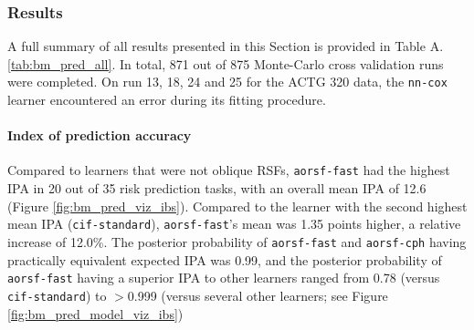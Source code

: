 \documentclass{article}\usepackage[]{graphicx}\usepackage[]{xcolor}
\newcommand{\tabrefAppendix}[1]{Table A.\ref{#1}}
\begin{document}
\subsubsection{Results} \label{sec:results_pred}

A full summary of all results presented in this Section is provided in \tabrefAppendix{tab:bm_pred_all}. In total, 871 out of 875 Monte-Carlo cross validation runs were completed. On run 13, 18, 24 and 25 for the ACTG 320 data, the \texttt{nn-cox} learner encountered an error during its fitting procedure.

\paragraph{Index of prediction accuracy}

Compared to learners that were not oblique RSFs, \texttt{aorsf-fast} had the highest IPA in 20 out of 35 risk prediction tasks, with an overall mean IPA of 12.6 (Figure \ref{fig:bm_pred_viz_ibs}). Compared to the learner with the second highest mean IPA (\texttt{cif-standard}), \texttt{aorsf-fast}'s mean was 1.35 points higher, a relative increase of 12.0\%. The posterior probability of \texttt{aorsf-fast} and \texttt{aorsf-cph} having practically equivalent expected IPA was 0.99, and the posterior probability of \texttt{aorsf-fast} having a superior IPA to other learners ranged from 0.78 (versus \texttt{cif-standard}) to $>$0.999 (versus several other learners; see Figure \ref{fig:bm_pred_model_viz_ibs})
\end{document}
